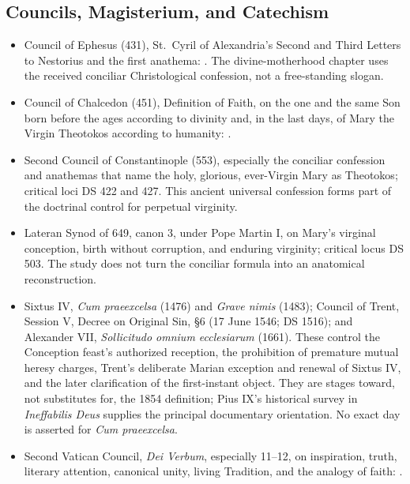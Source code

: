 \subsection{Councils, Magisterium, and Catechism}

\begin{itemize}
  \item Council of Ephesus (431), St.~Cyril of Alexandria's Second and Third Letters to Nestorius and the first anathema: .  The divine-motherhood chapter uses the received conciliar Christological confession, not a free-standing slogan.
  \item Council of Chalcedon (451), Definition of Faith, on the one and the same Son born before the ages according to divinity and, in the last days, of Mary the Virgin Theotokos according to humanity: .
  \item Second Council of Constantinople (553), especially the conciliar confession and anathemas that name the holy, glorious, ever-Virgin Mary as Theotokos; critical loci DS 422 and 427.  This ancient universal confession forms part of the doctrinal control for perpetual virginity.
  \item Lateran Synod of 649, canon 3, under Pope Martin I, on Mary's virginal conception, birth without corruption, and enduring virginity; critical locus DS 503.  The study does not turn the conciliar formula into an anatomical reconstruction.
  \item Sixtus IV, \emph{Cum praeexcelsa} (1476) and \emph{Grave nimis} (1483); Council of Trent, Session V, Decree on Original Sin, §6 (17 June 1546; DS 1516); and Alexander VII, \emph{Sollicitudo omnium ecclesiarum} (1661).  These control the Conception feast's authorized reception, the prohibition of premature mutual heresy charges, Trent's deliberate Marian exception and renewal of Sixtus IV, and the later clarification of the first-instant object.  They are stages toward, not substitutes for, the 1854 definition; Pius IX's historical survey in \emph{Ineffabilis Deus} supplies the principal documentary orientation.  No exact day is asserted for \emph{Cum praeexcelsa}.
  \item Second Vatican Council, \emph{Dei Verbum}, especially 11--12, on inspiration, truth, literary attention, canonical unity, living Tradition, and the analogy of faith: .

\end{itemize}
